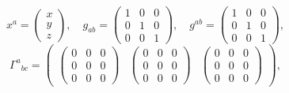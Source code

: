 \documentclass[11pt]{article}
\begin{document}
    $$x^{a}=\begin{pmatrix}x\\y\\z\end{pmatrix},\quad g_{ab}=\begin{pmatrix} 1 & 0 & 0\\ 0 & 1 & 0\\ 0 & 0 & 1 \end{pmatrix},\quad g^{ab}=\begin{pmatrix} 1 & 0 & 0\\ 0 & 1 & 0\\ 0 & 0 & 1 \end{pmatrix},$$
$${\Gamma^{a}}_{bc}=\begin{pmatrix} \begin{pmatrix} 0 & 0 & 0\\ 0 & 0 & 0\\ 0 & 0 & 0 \end{pmatrix} & \begin{pmatrix} 0 & 0 & 0\\ 0 & 0 & 0\\ 0 & 0 & 0 \end{pmatrix} & \begin{pmatrix} 0 & 0 & 0\\ 0 & 0 & 0\\ 0 & 0 & 0 \end{pmatrix} \end{pmatrix},$$
\end{document}
